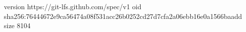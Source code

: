 version https://git-lfs.github.com/spec/v1
oid sha256:76444672e9ca56474a08f531acc26b0252cd27d7cfa2a06ebb16e0a1566baadd
size 8104
